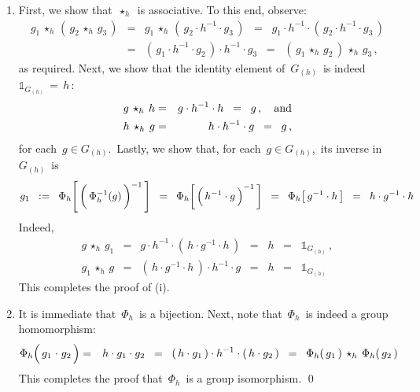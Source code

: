 \begin{enumerate}
\item
	First, we show that \,$\star_{h}$\, is associative. To this end, observe:
	\begin{eqnarray*}
	g_{1} \,\star_{h}\, (\,g_{2} \,\star_{h}\, g_{3}\,)
	& = &
		g_{1} \,\star_{h}\, (\,g_{2} \cdot h^{-1} \cdot g_{3}\,)
	\;\; = \;\;
		g_{1} \cdot h^{-1} \cdot (\,g_{2} \cdot h^{-1} \cdot g_{3}\,)
	\\
	& = &
		(\,g_{1} \cdot h^{-1} \cdot g_{2}\,) \cdot h^{-1} \cdot g_{3}
	\;\; = \;\;
		(\,g_{1} \,\star_{h}\, g_{2}\,) \,\star_{h}\, g_{3}\,,
	\end{eqnarray*}
	as required.
	\vskip 0.2cm
	\noindent
	Next, we show that the identity element of \,$G_{(h)}$\, is indeed
	\,$\mathds{1}_{G_{(h)}} \,=\, h$\,:
	\begin{eqnarray*}
	g \,\star_{h}\, h
	& = &
		g \cdot h^{-1} \cdot h
	\;\; = \;\;
		g\,,
		\quad
		\textnormal{and}
	\\
	h \,\star_{h}\, g
	& = &
		h \cdot h^{-1} \cdot g
	\;\; = \;\;
		g\,,
	\end{eqnarray*}
	for each \,$g \in G_{(h)}$.\,
	\vskip 0.2cm
	\noindent
	Lastly, we show that, for each \,$g \in G_{(h)}$,\, its inverse in \,$G_{(h)}$\, is
	\begin{equation*}
	g_{1}
	\;\; := \;\;
		\Phi_{h}\!\left[\,\left(\,\overset{{\color{white}.}}{\Phi_{h}^{-1}(g)}\,\right)^{-1}\,\right]
	\;\; = \;\;
		\Phi_{h}\!\left[\,\left(\,\overset{{\color{white}.}}{h^{-1} \cdot g}\,\right)^{-1}\,\right]
	\;\; = \;\;
		\Phi_{h}\!\left[\,g^{-1} \cdot h\,\right]
	\;\; = \;\;
		h \cdot g^{-1} \cdot h
	\end{equation*}
	Indeed,
	\begin{eqnarray*}
	g \,\star_{h}\, g_{1}
	& = &
		g \cdot h^{-1} \cdot (\,h \cdot g^{-1} \cdot h\,)
	\;\; = \;\;
		h
	\;\; = \;\;
		\mathds{1}_{G_{(h)}}\,,
	\\
	g_{1} \,\star_{h}\, g
	& = &
		(\,h \cdot g^{-1} \cdot h\,) \cdot h^{-1} \cdot g
	\;\; = \;\;
		h
	\;\; = \;\;
		\mathds{1}_{G_{(h)}}
	\end{eqnarray*}
	This completes the proof of (i).
\item
	It is immediate that \,$\Phi_{h}$\, is a bijection.
	Next, note that \,$\Phi_{h}$\, is indeed a group homomorphism:
	\begin{eqnarray*}
	\Phi_{h}\!\left(\,
		g_{1} \overset{{\color{white}1}}{\cdot} g_{2}
		\,\right)
	& = &
		h \cdot g_{1} \cdot g_{2}
	\;\; = \;\;
		\left(\,h \cdot g_{1}\,\right)
		\cdot h^{-1} \cdot
		\left(\,h \cdot g_{2}\,\right)
	\;\; = \;\;
		\Phi_{h}\!\left(\,g_{1}\,\right)
		\,\star_{h}\,
		\Phi_{h}\!\left(\,g_{2}\,\right)
	\end{eqnarray*}
	This completes the proof that \,$\Phi_{h}$\, is a group isomorphism.
	\qed
\end{enumerate}


